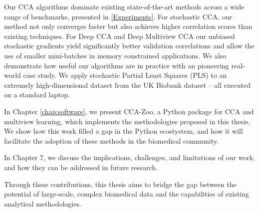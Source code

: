 Our CCA algorithms dominate existing state-of-the-art methods across a wide range of benchmarks, presented in \cref{Experiments}.
For stochastic CCA, our method not only converges faster but also achieves higher correlation scores than existing techniques.
For Deep CCA and Deep Multiview CCA our unbiased stochastic gradients yield significantly better validation correlations and allow the use of smaller mini-batches in memory constrained applications.
We also demonstrate how useful our algorithms are in practice with an pioneering real-world case study. We apply stochastic Partial Least Squares (PLS) to an extremely high-dimensional dataset from the UK Biobank dataset -- all executed on a standard laptop.

In Chapter \ref{chap:software}, we present CCA-Zoo, a Python package for CCA and multiview learning, which implements the methodologies proposed in this thesis. We show how this work filled a gap in the Python ecostystem, and how it will facilitate the adoption of these methods in the biomedical community.

In Chapter 7, we discuss the implications, challenges, and limitations of our work, and how they can be addressed in future research.

Through these contributions, this thesis aims to bridge the gap between the potential of large-scale, complex biomedical data and the capabilities of existing analytical methodologies.